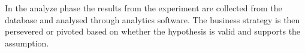 \documentclass[english]{tktltiki2}
\theoremstyle{definition}
\theoremstyle{remark}
\begin{document}
In the analyze phase the results from the experiment are collected from the database and analysed through analytics software. The business strategy is then persevered or pivoted based on whether the hypothesis is valid and supports the assumption.























\end{document}

